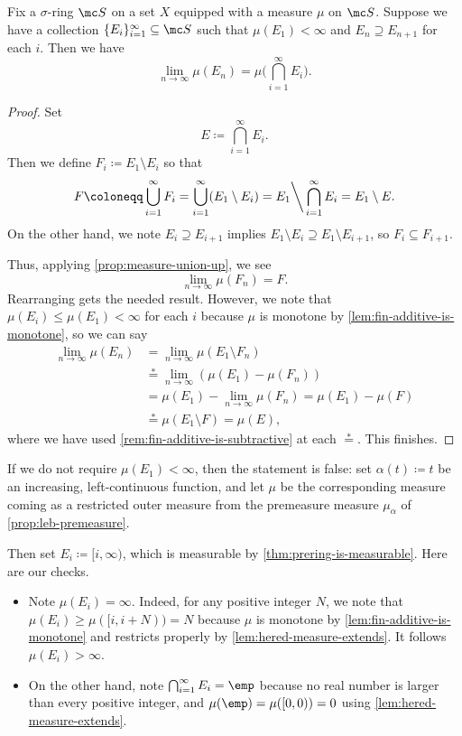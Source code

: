 \documentclass[../notes.tex]{subfiles}
\begin{document}
\begin{cor} \label{cor:measure-inter-down}
	Fix a $\sigma$-ring $\mc S$ on a set $X$ equipped with a measure $\mu$ on $\mc S$. Suppose we have a collection $\{E_i\}_{i=1}^\infty\subseteq\mc S$ such that $\mu(E_1)<\infty$ and $E_n\supseteq E_{n+1}$ for each $i$. Then we have
	\[\lim_{n\to\infty}\mu(E_n)=\mu\Bigg(\bigcap_{i=1}^\infty E_i\Bigg).\]
\end{cor}
\begin{proof}
	Set
	\[E\coloneqq\bigcap_{i=1}^\infty E_i.\]
	Then we define $F_i\coloneqq E_1\setminus E_i$ so that
	\[F\coloneqq\bigcup_{i=1}^\infty F_i=\bigcup_{i=1}^\infty(E_1\setminus E_i)=E_1{\mathbin\bigg\backslash}\bigcap_{i=1}^\infty E_i=E_1\setminus E.\]
	On the other hand, we note $E_i\supseteq E_{i+1}$ implies $E_1\setminus E_i\supseteq E_1\setminus E_{i+1}$, so $F_i\subseteq F_{i+1}$.

	Thus, applying \autoref{prop:measure-union-up}, we see
	\[\lim_{n\to\infty}\mu(F_n)=F.\]
	Rearranging gets the needed result. However, we note that $\mu(E_i)\le\mu(E_1)<\infty$ for each $i$ because $\mu$ is monotone by \autoref{lem:fin-additive-is-monotone}, so we can say
	\begin{align*}
		\lim_{n\to\infty}\mu(E_n) &= \lim_{n\to\infty}\mu(E_1\setminus F_n) \\
		&\stackrel*= \lim_{n\to\infty}(\mu(E_1)-\mu(F_n)) \\
		&= \mu(E_1)-\lim_{n\to\infty}\mu(F_n)=\mu(E_1)-\mu(F) \\
		&\stackrel*= \mu(E_1\setminus F)=\mu(E),
	\end{align*}
	where we have used \autoref{rem:fin-additive-is-subtractive} at each $\stackrel*=$. This finishes.
\end{proof}
\begin{remark}
	If we do not require $\mu(E_1)<\infty$, then the statement is false: set $\alpha(t)\coloneqq t$ be an increasing, left-continuous function, and let $\mu$ be the corresponding measure coming as a restricted outer measure from the premeasure measure $\mu_\alpha$ of \autoref{prop:leb-premeasure}.
	
	Then set $E_i\coloneqq[i,\infty)$, which is measurable by \autoref{thm:prering-is-measurable}. Here are our checks.
	\begin{itemize}
		\item Note $\mu(E_i)=\infty$. Indeed, for any positive integer $N$, we note that $\mu(E_i)\ge\mu([i,i+N))=N$ because $\mu$ is monotone by \autoref{lem:fin-additive-is-monotone} and restricts properly by \autoref{lem:hered-measure-extends}. It follows $\mu(E_i)>\infty$.
		\item On the other hand, note $\bigcap_{i=1}^\infty E_i=\emp$ because no real number is larger than every positive integer, and $\mu(\emp)=\mu([0,0))=0$ using \autoref{lem:hered-measure-extends}.
	\end{itemize}
\end{remark}
\end{document}
